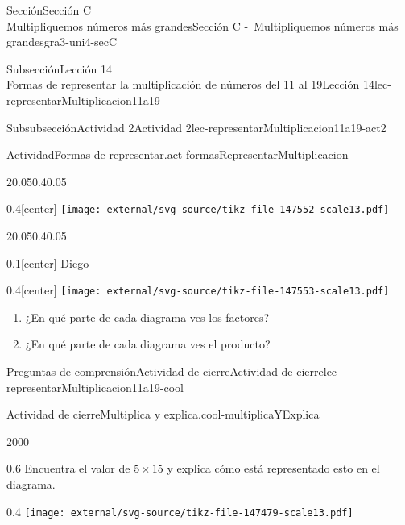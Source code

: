 \begin{sectionptx}{Sección}{{\Large Sección C\\}Multipliquemos números más grandes}{}{Sección C -~Multipliquemos números más grandes}{}{}{gra3-uni4-secC}
\begin{subsectionptx}{Subsección}{{\normalsize Lección 14\\[-0.05cm]}Formas de representar la multiplicación de números del 11 al 19}{}{Lección 14}{}{}{lec-representarMultiplicacion11a19}
\begin{subsubsectionptx}{Subsubsección}{Actividad 2}{}{Actividad 2}{}{}{lec-representarMultiplicacion11a19-act2}
\begin{activity}{Actividad}{Formas de representar.}{act-formasRepresentarMultiplicacion}
\begin{sidebyside}{2}{0.05}{0.4}{0.05}
\begin{sbspanel}{0.4}[center]%
\texttt{[image: external/svg-source/tikz-file-147552-scale13.pdf]}
\end{sbspanel}%
\end{sidebyside}%
\begin{sidebyside}{2}{0.05}{0.4}{0.05}%
\begin{sbspanel}{0.1}[center]%
Diego%
\end{sbspanel}%
\begin{sbspanel}{0.4}[center]%
\texttt{[image: external/svg-source/tikz-file-147553-scale13.pdf]}
\end{sbspanel}%
\end{sidebyside}%
%
\begin{enumerate}
\item{}¿En qué parte de cada diagrama ves los factores?%
\item{}¿En qué parte de cada diagrama ves el producto?%
\end{enumerate}
\end{activity}%
\end{subsubsectionptx}
%
%
\typeout{************************************************}
\typeout{************************************************}
%
\begin{reading-questions-subsubsection}{Preguntas de comprensión}{Actividad de cierre}{}{Actividad de cierre}{}{}{lec-representarMultiplicacion11a19-cool}
\begin{project}{Actividad de cierre}{Multiplica y explica.}{cool-multiplicaYExplica}%
\begin{sidebyside}{2}{0}{0}{0}%
\begin{sbspanel}{0.6}%
Encuentra el valor de \(5\times 15\) y explica cómo está representado esto en el diagrama.%
\end{sbspanel}%
\begin{sbspanel}{0.4}%
\texttt{[image: external/svg-source/tikz-file-147479-scale13.pdf]}
\end{sbspanel}%
\end{sidebyside}%
\end{project}%
\end{reading-questions-subsubsection}
\end{subsectionptx}
%
%
\typeout{************************************************}
\typeout{************************************************}

\end{sectionptx}
